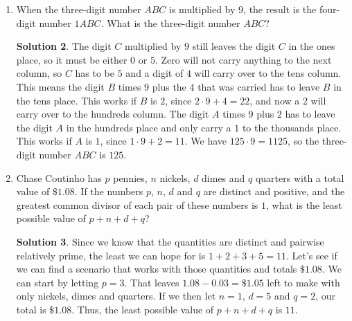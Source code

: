 \documentclass{article}
\theoremstyle{definition}
\newtheorem*{solution}{Solution}
\begin{document}
\begin{multicols}{2}
\begin{enumerate}
\begin{solution}
            The prime factorization of $365$ is $5 \cdot 73$.
            We know that $130$ has $5$ as a factor, but not $73$.
            The LCM is $130 \cdot 73 = 9490$.
        \end{solution}
        \item When the three-digit number $ABC$ is multiplied by $9$, the result is the four-digit number $1ABC$.
        What is the three-digit number $ABC$?
        \begin{solution}
            The digit $C$ multiplied by $9$ still leaves the digit $C$ in the ones place, so it must be either $0$ or $5$.
            Zero will not carry anything to the next column, so $C$ has to be $5$ and a digit of $4$ will carry over to the tens column.
            This means the digit $B$ times $9$ plus the $4$ that was carried has to leave $B$ in the tens place.
            This works if $B$ is $2$, since $2 \cdot 9 + 4 = 22$, and now a $2$ will carry over to the hundreds column.
            The digit $A$ times $9$ plus $2$ has to leave the digit $A$ in the hundreds place and only carry a $1$ to the thousands place.
            This works if $A$ is $1$, since $1 \cdot 9 + 2 = 11$. We have $125 \cdot 9 = 1125$, so the three-digit number $ABC$ is $125$.
        \end{solution}
        \item Chase Coutinho has $p$ pennies, $n$ nickels, $d$ dimes and $q$ quarters with a total value of $\$1.08$.
        If the numbers $p$, $n$, $d$ and $q$ are distinct and positive,
        and the greatest common divisor of each pair of these numbers is $1$,
        what is the least possible value of $p + n + d + q$?
        \begin{solution}
            Since we know that the quantities are distinct and pairwise relatively prime, the least we can hope for is $1 + 2 + 3 + 5 = 11$.
            Let's see if we can find a scenario that works with those quantities and totals $\$1.08$.
            We can start by letting $p = 3$. That leaves $1.08 - 0.03 = \$1.05$ left to make with only nickels, dimes and quarters.
            If we then let $n = 1$, $d = 5$ and $q = 2$, our total is $\$1.08$.
            Thus, the least possible value of $p + n + d + q$ is $11$.
        \end{solution}
    \end{enumerate}
\end{multicols}
\end{document}
